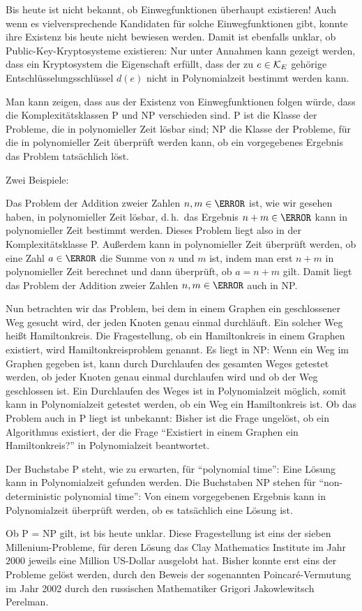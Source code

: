   \begin{remark}
   Bis heute ist nicht bekannt, ob Einwegfunktionen überhaupt existieren! Auch wenn es vielversprechende Kandidaten für solche Einwegfunktionen gibt, konnte ihre Existenz bis heute nicht bewiesen werden. Damit ist ebenfalls unklar, ob Public-Key-Kryptosysteme existieren: Nur unter Annahmen kann gezeigt werden, dass ein Kryptosystem die Eigenschaft erfüllt, dass der zu $e \in \mathcal K_E$ gehörige Entschlüsselungsschlüssel $d(e)$ nicht in Polynomialzeit bestimmt werden kann.
   
   Man kann zeigen, dass aus der Existenz von Einwegfunktionen folgen würde, dass die Komplexitätsklassen P und NP verschieden sind. P ist die Klasse der Probleme, die in polynomieller Zeit lösbar sind; NP die Klasse der Probleme, für die in polynomieller Zeit überprüft werden kann, ob ein vorgegebenes Ergebnis das Problem tatsächlich löst. 
  
   Zwei Beispiele:
   
   Das Problem der Addition zweier Zahlen $n, m \in \N$ ist, wie wir gesehen haben, in polynomieller Zeit lösbar, d.\,h.~das Ergebnis $n+m \in \N$ kann in polynomieller Zeit bestimmt werden. Dieses Problem liegt also in der Komplexitätsklasse P. Außerdem kann in polynomieller Zeit überprüft werden, ob eine Zahl $a \in \N$ die Summe von $n$ und $m$ ist, \zB indem man erst $n+m$ in polynomieller Zeit berechnet und dann überprüft, ob $a = n + m$ gilt. Damit liegt das Problem der Addition zweier Zahlen $n, m \in \N$ auch in NP. 
   
   Nun betrachten wir das Problem, bei dem in einem Graphen ein geschlossener Weg gesucht wird, der jeden Knoten genau einmal durchläuft. Ein solcher Weg heißt Hamiltonkreis. Die Fragestellung, ob ein Hamiltonkreis in einem Graphen existiert, wird Hamiltonkreisproblem genannt. Es liegt in NP: Wenn ein Weg im Graphen gegeben ist, kann durch Durchlaufen des gesamten Weges getestet werden, ob jeder Knoten genau einmal durchlaufen wird und ob der Weg geschlossen ist. Ein Durchlaufen des Weges ist in Polynomialzeit möglich, somit kann in Polynomialzeit getestet werden, ob ein Weg ein Hamiltonkreis ist. Ob das Problem auch in P liegt ist unbekannt: Bisher ist die Frage ungelöst, ob ein Algorithmus existiert, der die Frage \enquote{Existiert in einem Graphen ein Hamiltonkreis?} in Polynomialzeit beantwortet.
   
   Der Buchstabe P steht, wie zu erwarten, für \enquote{polynomial time}: Eine Lösung kann in Polynomialzeit gefunden werden. Die Buchstaben NP stehen für \enquote{non-deterministic polynomial time}: Von einem vorgegebenen Ergebnis kann in Polynomialzeit überprüft werden, ob es tatsächlich eine Lösung ist.
   
   Ob P = NP gilt, ist bis heute unklar. Diese Fragestellung ist eins der sieben Millenium-Probleme, für deren Lösung das Clay Mathematics Institute im Jahr $2000$ jeweils eine Million US-Dollar ausgelobt hat. Bisher konnte erst eins der Probleme gelöst werden, durch den Beweis der sogenannten Poincaré-Vermutung im Jahr 2002 durch den russischen Mathematiker Grigori Jakowlewitsch Perelman.
  \end{remark}
  
